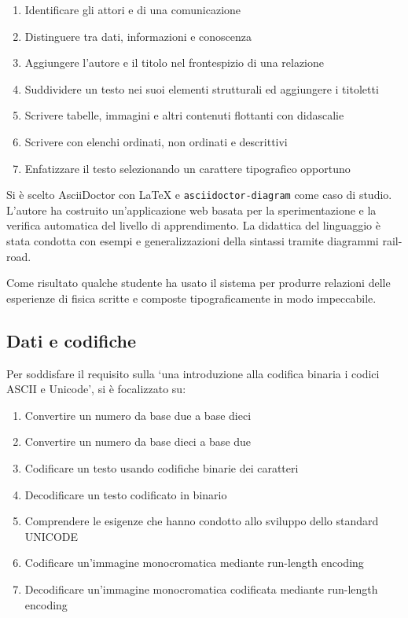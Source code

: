 \documentclass[a4paper]{easychair}
\begin{document}
\begin{enumerate}
\item
  Identificare gli attori e di una comunicazione
\item
  Distinguere tra dati, informazioni e conoscenza
\item
  Aggiungere l'autore e il titolo nel frontespizio di una relazione
\item
  Suddividere un testo nei suoi elementi strutturali ed aggiungere i
  titoletti
\item
  Scrivere tabelle, immagini e altri contenuti flottanti con didascalie
\item
  Scrivere con elenchi ordinati, non ordinati e descrittivi
\item
  Enfatizzare il testo selezionando un carattere tipografico opportuno
\end{enumerate}

Si è scelto AsciiDoctor\cite{asciidoctor} con \LaTeX{} e \texttt{asciidoctor-diagram} come caso di studio.
L'autore ha costruito un'applicazione web basata per
la sperimentazione e la verifica automatica del livello di apprendimento.
La didattica del linguaggio è stata condotta con esempi e generalizzazioni
della sintassi tramite diagrammi rail-road.

Come risultato qualche studente ha usato il sistema per produrre
relazioni delle esperienze di fisica scritte e composte tipograficamente
in modo impeccabile.

\subsection[Dati e codifiche]{Dati e codifiche} 

Per soddisfare il requisito sulla `\textellipsis una introduzione alla codifica binaria
\textellipsis i codici ASCII e Unicode', si è focalizzato su:

\begin{enumerate}
  \item
    Convertire un numero da base due a base dieci
  \item
    Convertire un numero da base dieci a base due
  \item
    Codificare un testo usando codifiche binarie dei caratteri
  \item
    Decodificare un testo codificato in binario
  \item
    Comprendere le esigenze che hanno condotto allo sviluppo dello
    standard UNICODE
  \item
    Codificare un'immagine monocromatica mediante run-length encoding
  \item
    Decodificare un'immagine monocromatica codificata mediante run-length
    encoding
\end{enumerate}  
\end{document}

